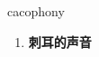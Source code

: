 
\begin{frame}
{\huge cacophony}
\begin{center}
\begin{enumerate}\Large
  \item \textbf{刺耳的声音}
\end{enumerate}
\end{center}
\end{frame}
